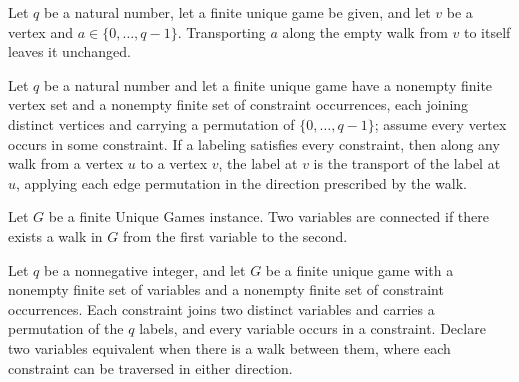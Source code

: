 \begin{theorem}
\label{FABL.FiniteUniqueGame.Walk.transport_nil}
\leanok
{}
Let $q$ be a natural number, let a finite unique game be given, and let $v$ be a vertex
and $a\in\{0,\ldots,q-1\}$. Transporting $a$ along the empty walk from $v$ to itself
leaves it unchanged.
\end{theorem}

\begin{theorem}
\label{FABL.FiniteUniqueGame.Walk.label_eq_transport}
\leanok
{}
Let $q$ be a natural number and let a finite unique game have a nonempty finite vertex
set and a nonempty finite set of constraint occurrences, each joining distinct vertices
and carrying a permutation of $\{0,\ldots,q-1\}$; assume every vertex occurs in some
constraint. If a labeling satisfies every constraint, then along any walk from a vertex
$u$ to a vertex $v$, the label at $v$ is the transport of the label at $u$, applying
each edge permutation in the direction prescribed by the walk.
\end{theorem}

\begin{definition}
\label{FABL.FiniteUniqueGame.Connected}
\leanok
{}
Let $G$ be a finite Unique Games instance. Two variables are connected if there exists a
walk in $G$ from the first variable to the second.
\end{definition}

\begin{definition}
\label{FABL.FiniteUniqueGame.connectedSetoid}
\leanok
{}
Let $q$ be a nonnegative integer, and let $G$ be a finite unique game with a nonempty
finite set of variables and a nonempty finite set of constraint occurrences. Each
constraint joins two distinct variables and carries a permutation of the $q$ labels, and
every variable occurs in a constraint. Declare two variables equivalent when there is a
walk between them, where each constraint can be traversed in either direction.
\end{definition}


